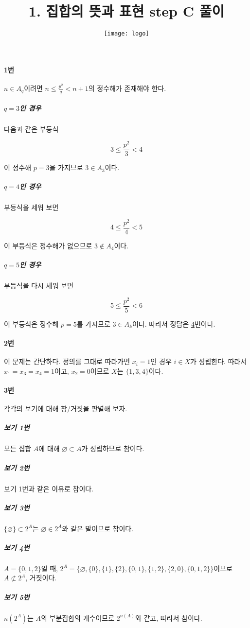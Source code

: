 \documentclass{article}
\title{1. 집합의 뜻과 표현 step C 풀이}
\author{
    \texttt{[image: logo]}
}
\date{}
\begin{document}
\maketitle

\paragraph{1번}
$n \in A_q$이려면 $n \le \frac{p^2}{q} < n + 1$의 정수해가 존재해야 한다.

\subparagraph{$q = 3$인 경우}
다음과 같은 부등식

\[
3 \le \frac{p^2}{3} < 4
\]

이 정수해 $p = 3$을 가지므로 $3 \in A_3$이다.

\subparagraph{$q = 4$인 경우}
부등식을 세워 보면

\[
4 \le \frac{p^2}{4} < 5
\]

이 부등식은 정수해가 없으므로 $3 \notin A_4$이다.

\subparagraph{$q = 5$인 경우}
부등식을 다시 세워 보면

\[
5 \le \frac{p^2}{5} < 6
\]

이 부등식은 정수해 $p = 5$를 가지므로 $3 \in A_k$이다. 따라서 정답은 \underline{4}번이다.

\paragraph{2번}
이 문제는 간단하다. 정의를 그대로 따라가면 $x_i = 1$인 경우 $i \in X$가 성립한다. \newline 따라서 $x_1 = x_3 = x_4 = 1$이고, $x_2 = 0$이므로 $X$는 \underline{$\{1, 3, 4\}$}이다.

\paragraph{3번}
각각의 보기에 대해 참/거짓을 판별해 보자.

\subparagraph{보기 1번}
모든 집합 $A$에 대해 $\varnothing \subset A$가 성립하므로 참이다.

\subparagraph{보기 2번}
보기 1번과 같은 이유로 참이다.

\subparagraph{보기 3번}
$\{ \varnothing \} \subset 2^A$는 $\varnothing \in 2^A$와 같은 말이므로 참이다.

\subparagraph{보기 4번}
$A = \{0, 1, 2\}$일 때, $2^A = \{\varnothing, \{0\}, \{1\}, \{2\}, \{0, 1\}, \{1, 2\}, \{2, 0\}, \{0, 1, 2\}\}$이므로 $A \not\subset 2^A$, 거짓이다.

\subparagraph{보기 5번}
$n(2^A)$는 $A$의 부분집합의 개수이므로 $2^{n(A)}$와 같고, 따라서 참이다. \newline
\end{document}
